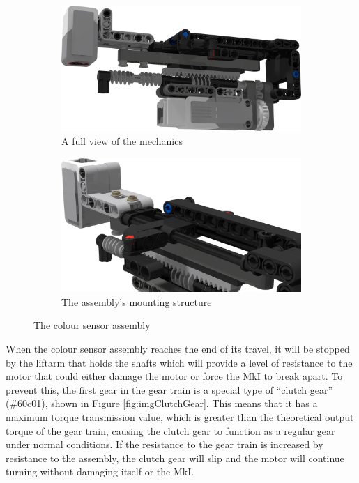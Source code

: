 \documentclass{report}
\newcommand{\legopiece}[1]{(\##1)}
\begin{document}
	\begin{figure}[H]
		\centering
		\begin{subfigure}[b]{0.43427\textwidth}
			\includegraphics[width=\textwidth]{Resources/Images/rdrColorSensorAssembly.png}
			\caption{A full view of the mechanics}
			\label{fig:rdrColorSensorAssembly}
		\end{subfigure}
		\hspace{10mm}
		\begin{subfigure}[b]{0.4\textwidth}
			\includegraphics[width=\textwidth]{Resources/Images/rdrColorSensorShaftDetail.png}
			\caption{The assembly's mounting structure}
			\label{fig:rdrColorSensorShaftDetail}
		\end{subfigure}
		\caption{The colour sensor assembly}
		\label{fig:rdrColorSensor}
	\end{figure}
	
	When the colour sensor assembly reaches the end of its travel, it will be stopped by the liftarm that holds the shafts which will provide a level of resistance to the motor that could either damage the motor or force the MkI to break apart. To prevent this, the first gear in the gear train is a special type of \enquote{clutch gear} \legopiece{60c01}, shown in Figure \ref{fig:imgClutchGear}. This means that it has a maximum torque transmission value, which is greater than the theoretical output torque of the gear train, causing the clutch gear to function as a regular gear under normal conditions. If the resistance to the gear train is increased by resistance to the assembly, the clutch gear will slip and the motor will continue turning without damaging itself or the MkI. 
	
\end{document}
